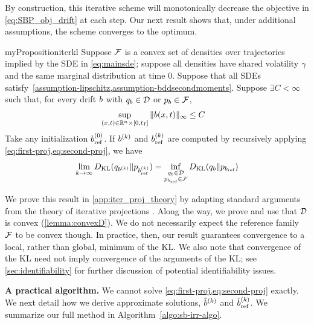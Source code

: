 By construction, this iterative scheme will monotonically decrease the objective in \cref{eq:SBP_obj_drift} at each step. Our next result shows that, under additional assumptions, the scheme converges to the optimum.
\begin{restatable}{myProposition}{iterkl}
\label{prop:iter-kl}
Suppose $\mathcal{F}$ is a convex set of densities over trajectories implied by the SDE in \cref{eq:mainsde}; suppose all densities have shared volatility $\gamma$ and the same marginal distribution at time $0$.
Suppose that all SDEs satisfy~\cref{assumption-lipschitz,assumption-bddsecondmoments}.
Suppose $\exists C < \infty$ such that, for every drift $\drift$ with $\bridge_{\modeldrift} \in \measurefamily$ or $\refden_{\modeldrift}\in\modelfamily$,
\begin{align*}
&\sup_{(x,t) \in \mathbb{R}^n \times [0,\timestep{\totsteps}]} \| \drift(x, t)\|_{\infty} \leq C 
\end{align*}
Take any initialization $\refdrift^{(0)}$. If $\drift^{(\iteralgo)}$ and $\refdrift^{(\iteralgo)}$ are computed by recursively applying \cref{eq:first-proj,eq:second-proj}, we have
\[
    \lim_{\iteralgo \to \infty} \KL(\bridge_{\drift^{(\iteralgo)}} \| \refden_{\refdrift^{(\iteralgo)}}) = \inf_{\substack{\bridge_{\drift} \in \measurefamily \\ \refden_{\refdrift} \in \modelfamily}} \KL(\bridge_{\drift} \| \refden_{\refdrift})
\]
\end{restatable}
We prove this result in \cref{app:iter_proj_theory} by adapting standard arguments from the theory of iterative projections \citep{csiszar1975divergence, csiszar2004information, benamou2015iterative}. Along the way, we prove and use that $\mathcal{D}$ is convex (\cref{lemma:convexD}). We do not necessarily expect the reference family $\mathcal{F}$ to be convex though. In practice, then, our result guarantees convergence to a local, rather than global, minimum of the KL. We also note that convergence of the KL need not imply convergence of the arguments of the KL; see \cref{sec:identifiability} for further discussion of potential identifiability issues.


\textbf{A practical algorithm.}
We cannot solve \cref{eq:first-proj,eq:second-proj} exactly. We next detail how we derive approximate solutions, $\estimatedriftstep{{(\iteralgo)}}$ and $\estimaterefdriftstep{{(\iteralgo)}}$. We summarize our full method in Algorithm~\ref{algo:sb-irr-algo}.

